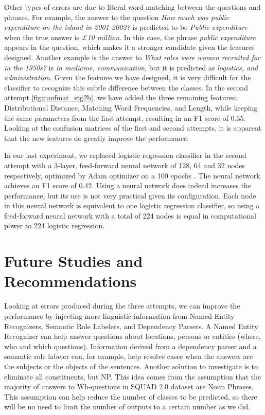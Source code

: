 Other types of errors are due to literal word matching between the questions and phrases. For example, the answer to the question \emph{How much was public expenditure on the island in 2001-2002?} is predicted to be \emph{Public expenditure} when the true answer is \emph{£10 million}. In this case, the phrase \emph{public expenditure} appears in the question, which makes it a stronger candidate given the features designed. Another example is the answer to \textit{What roles were women recruited for in the 1950s?} is \emph{in medicine, communication}, but it is predicted as \emph{logistics, and administration}. Given the features we have designed, it is very difficult for the classifier to recognize this subtle difference between the classes. 
In the second attempt \ref{fig:confmat_stg2b}, we have added the three remaining features: Distributional Distance, Matching Word Frequencies, and Length, while keeping the same parameters from the first attempt, resulting in an F1 score of 0.35. Looking at the confusion matrices of the first and second attempts, it is apparent that the new features do greatly improve the performance.

In our last experiment, we replaced logistic regression classifier in the second attempt with a 3-layer, feed-forward neural network of 128, 64 and 32 nodes respectively, optimized by Adam optimizer on a 100 epochs . The neural network achieves an F1 score of 0.42. Using a neural network does indeed increases the performance, but its use is not very practical given its configuration. Each node in this neural network is equivalent to one logistic regression classifier, so using a feed-forward neural network with a total of 224 nodes is equal in computational power to 224 logistic regression. 

\section{Future Studies and Recommendations}
Looking at errors produced during the three attempts, we can improve the performance by injecting more linguistic information from Named Entity Recognizers, Semantic Role Labelers, and Dependency Parsers. A Named Entity Recognizer can help answer questions about locations, persons or entities (where, who and which questions). Information derived from a dependency parser and a semantic role labeler can, for example, help resolve cases when the answers are the subjects or the objects of the sentences. Another solution to investigate is to eliminate all constituents, but NP. This idea comes from the assumption that the majority of answers to Wh-questions in SQUAD 2.0 dataset are Noun Phrases. This assumption can help reduce the number of classes to be predicted, so there will be no need to limit the number of outputs to a certain number as we did.

